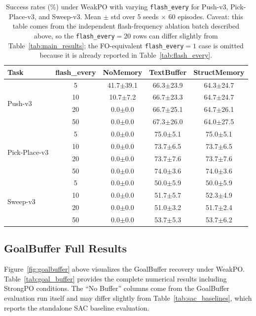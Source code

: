 \begin{table}[t]
\centering
\caption{Success rates (\%) under WeakPO with varying \texttt{flash\_every} for Push-v3, Pick-Place-v3, and Sweep-v3. Mean $\pm$ std over 5 seeds $\times$ 60 episodes. Caveat: this table comes from the independent flash-frequency ablation batch described above, so the \texttt{flash\_every}$=20$ rows can differ slightly from Table~\ref{tab:main_results}; the FO-equivalent \texttt{flash\_every}$=1$ case is omitted because it is already reported in Table~\ref{tab:flash_every}.}
\label{tab:flash_every_full}
\begin{tabular}{l cccc}
\toprule
Task & flash\_every & NoMemory & TextBuffer & StructMemory \\
\midrule
\multirow{4}{*}{Push-v3}
 & 5  & 41.7$\pm$39.1 & 66.3$\pm$23.9 & 64.3$\pm$24.7 \\
 & 10 & 10.7$\pm$7.2  & 66.7$\pm$23.3 & 64.7$\pm$24.7 \\
 & 20 &  0.0$\pm$0.0  & 66.7$\pm$25.1 & 64.7$\pm$26.1 \\
 & 50 &  0.0$\pm$0.0  & 67.3$\pm$26.0 & 64.0$\pm$27.5 \\
\midrule
\multirow{4}{*}{Pick-Place-v3}
 & 5  &  0.0$\pm$0.0  & 75.0$\pm$5.1  & 75.0$\pm$5.1 \\
 & 10 &  0.0$\pm$0.0  & 73.7$\pm$6.5  & 73.7$\pm$6.5 \\
 & 20 &  0.0$\pm$0.0  & 73.7$\pm$7.6  & 73.7$\pm$7.6 \\
 & 50 &  0.0$\pm$0.0  & 74.0$\pm$3.6  & 74.0$\pm$3.6 \\
\midrule
\multirow{4}{*}{Sweep-v3}
 & 5  &  0.0$\pm$0.0  & 50.0$\pm$5.9  & 50.0$\pm$5.9 \\
 & 10 &  0.0$\pm$0.0  & 51.7$\pm$5.7  & 52.3$\pm$4.9 \\
 & 20 &  0.0$\pm$0.0  & 51.0$\pm$3.2  & 51.7$\pm$2.4 \\
 & 50 &  0.0$\pm$0.0  & 53.7$\pm$5.3  & 53.7$\pm$6.2 \\
\bottomrule
\end{tabular}
\end{table}

\subsection{GoalBuffer Full Results}

Figure~\ref{fig:goalbuffer} above visualizes the GoalBuffer recovery under WeakPO. Table~\ref{tab:goal_buffer} provides the complete numerical results including StrongPO conditions. The ``No Buffer'' columns come from the GoalBuffer evaluation run itself and may differ slightly from Table~\ref{tab:sac_baselines}, which reports the standalone SAC baseline evaluation.

